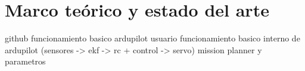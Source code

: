 \chapter{Marco teórico y estado del arte}
github
funcionamiento basico ardupilot usuario
funcionamiento basico interno de ardupilot (sensores -> ekf -> rc + control -> servo)
mission planner y parametros